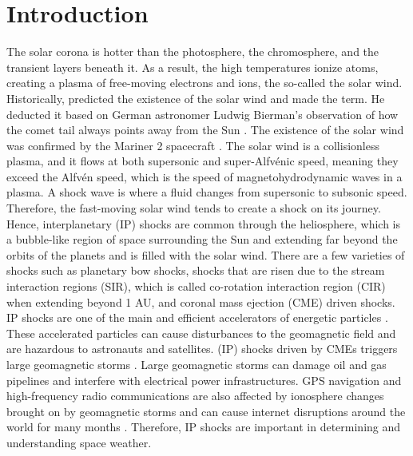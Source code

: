 \documentclass[draft]{agujournal2019}
\begin{document}
\section{Introduction}
\label{sec:intro}

The solar corona is hotter than the photosphere, the chromosphere, and the transient layers beneath it. As a result, the high temperatures ionize atoms, creating a plasma of free-moving electrons and ions, the so-called the solar wind. Historically, \cite{parker58:_dynam_inter_gas_magnet_field} predicted the existence of the solar wind and made the term. He deducted it based on German astronomer Ludwig Bierman's observation of how the comet tail always points away from the Sun \cite{biermann57:_solar}. The existence of the solar wind was confirmed by the Mariner 2 spacecraft \cite{snyder65:_inter_solar_wind_measur_marin_ii}. The solar wind is a collisionless plasma, and it flows at both supersonic and super-Alfvénic speed, meaning they exceed the Alfv{\'e}n speed, which is the speed of magnetohydrodynamic waves in a plasma. A shock wave is where a fluid changes from supersonic to subsonic speed. Therefore, the fast-moving solar wind tends to create a shock on its journey. Hence, interplanetary (IP) shocks are common through the heliosphere, which is a bubble-like region of space surrounding the Sun and extending far beyond the orbits of the planets and is filled with the solar wind. There are a few varieties of shocks such as planetary bow shocks, shocks that are risen due to the stream interaction regions (SIR), which is called co-rotation interaction region (CIR) when extending beyond 1 AU, and coronal mass ejection (CME) driven shocks. IP shocks are one of the main and efficient accelerators of energetic particles \cite{tsurutani85:_accel_au, keith21:_histor}. These accelerated particles can cause disturbances to the geomagnetic field and are hazardous to astronauts and satellites. (IP) shocks driven by CMEs triggers large geomagnetic storms \cite{gonzalez94:_what}. Large geomagnetic storms can damage oil and gas pipelines and interfere with electrical power infrastructures. GPS navigation and high-frequency radio communications are also affected by ionosphere changes brought on by geomagnetic storms \cite{cid14} and can cause internet disruptions around the world for many months \cite{jyothi21:_solar_super}. Therefore, IP shocks are important in determining and understanding space weather.
\end{document}
